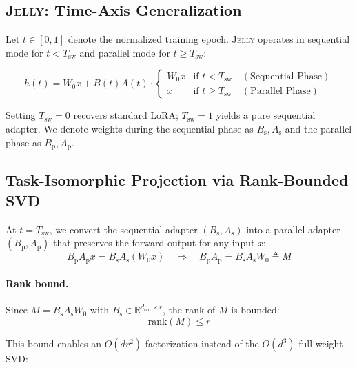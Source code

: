 \documentclass{article}
\newcommand{\Wbase}{W_0}
\newcommand{\Aseq}{A_{\mathrm{s}}}
\newcommand{\Bseq}{B_{\mathrm{s}}}
\newcommand{\Apar}{A_{\mathrm{p}}}
\newcommand{\Bpar}{B_{\mathrm{p}}}
\newcommand{\Tswitch}{T_{\mathrm{sw}}}
\newcommand{\jelly}{\textsc{Jelly}}
\begin{document}
\subsection{\jelly{}: Time-Axis Generalization}
\label{sec:portal}

Let $t \in [0, 1]$ denote the normalized training epoch. \jelly{} operates in sequential mode for $t < \Tswitch$ and parallel mode for $t \geq \Tswitch$:

\begin{equation}
h(t) = \Wbase x + B(t) A(t) \cdot
\begin{cases}
\Wbase x & \text{if } t < \Tswitch \quad (\text{Sequential Phase})\\
x & \text{if } t \geq \Tswitch \quad (\text{Parallel Phase})
\end{cases}
\label{eq:portal}
\end{equation}

Setting $\Tswitch = 0$ recovers standard LoRA; $\Tswitch = 1$ yields a pure sequential adapter.
We denote weights during the sequential phase as $\Bseq, \Aseq$ and the parallel phase as $\Bpar, \Apar$.


\subsection{Task-Isomorphic Projection via Rank-Bounded SVD}
\label{sec:projection}

At $t = \Tswitch$, we convert the sequential adapter $(\Bseq, \Aseq)$ into a parallel adapter $(\Bpar, \Apar)$ that preserves the forward output for any input $x$:
\begin{equation}
\Bpar \Apar x = \Bseq \Aseq (\Wbase x) \quad \Longrightarrow \quad \Bpar \Apar = \Bseq \Aseq \Wbase \triangleq M
\label{eq:equivalence}
\end{equation}

\paragraph{Rank bound.}
Since $M = \Bseq \Aseq \Wbase$ with $\Bseq \in \mathbb{R}^{d_{\mathrm{out}} \times r}$, the rank of $M$ is bounded:
\begin{equation*}
    \mathrm{rank}(M) \leq r
\end{equation*}

This bound enables an $O(dr^2)$ factorization instead of the $O(d^3)$ full-weight SVD:
\end{document}
